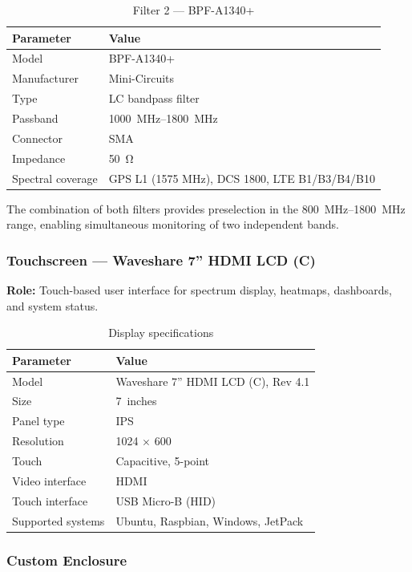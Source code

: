 \documentclass[12pt,a4paper]{article}
\begin{document}
\begin{table}[H]
\centering
\caption{Filter 2 --- BPF-A1340+}
\begin{tabular}{@{}ll@{}}
\toprule
\textbf{Parameter} & \textbf{Value} \\
\midrule
Model & BPF-A1340+ \\
Manufacturer & Mini-Circuits \\
Type & LC bandpass filter \\
Passband & \qtyrange{1000}{1800}{\MHz} \\
Connector & SMA \\
Impedance & \qty{50}{\ohm} \\
Spectral coverage & GPS L1 (1575 MHz), DCS 1800, LTE B1/B3/B4/B10 \\
\bottomrule
\end{tabular}
\end{table}

The combination of both filters provides preselection in the \qtyrange{800}{1800}{\MHz} range, enabling simultaneous monitoring of two independent bands.

\subsubsection{Touchscreen --- Waveshare 7'' HDMI LCD (C)}

\textbf{Role:} Touch-based user interface for spectrum display, heatmaps, dashboards, and system status.

\begin{table}[H]
\centering
\caption{Display specifications}
\begin{tabular}{@{}ll@{}}
\toprule
\textbf{Parameter} & \textbf{Value} \\
\midrule
Model & Waveshare 7'' HDMI LCD (C), Rev 4.1 \\
Size & 7~inches \\
Panel type & IPS \\
Resolution & 1024 $\times$ 600 \\
Touch & Capacitive, 5-point \\
Video interface & HDMI \\
Touch interface & USB Micro-B (HID) \\
Supported systems & Ubuntu, Raspbian, Windows, JetPack \\
\bottomrule
\end{tabular}
\end{table}

\subsubsection{Custom Enclosure}
\end{document}
